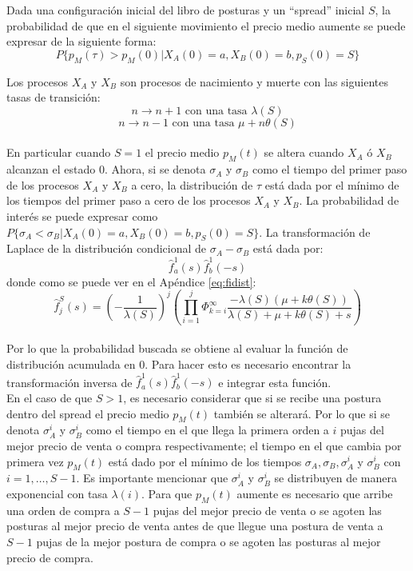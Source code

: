 \documentclass[11pt]{article}
\numberwithin{equation}{section} %
\begin{document}
Dada una configuración inicial del libro de posturas y un ``spread'' inicial $S$, la probabilidad de que en el siguiente movimiento el precio medio aumente se puede expresar de la siguiente forma:
\[
P\{p_M(\tau)>p_M(0)|X_A(0)=a,X_B(0)=b,p_S(0)=S\}
\]

Los procesos $X_A$ y $X_B$ son procesos de nacimiento y muerte con las siguientes tasas de transición:
\[
n\rightarrow n+1 \text{ con una tasa }\lambda(S)
\]
\[
n\rightarrow n-1 \text{ con una tasa }\mu+n\theta(S)
\]\\

En particular cuando $S=1$ el precio medio $p_M(t)$ se altera cuando $X_A$ ó $X_B$ alcanzan el estado 0. Ahora, si se denota $\sigma_A$ y $\sigma_B$ como el tiempo del primer paso de los procesos $X_A$ y $X_B$ a cero, la distribución de $\tau$ está dada por el mínimo de los tiempos del primer paso a cero de los procesos $X_A$ y $X_B$. La probabilidad de interés se puede expresar como $P\{\sigma_A<\sigma_B|X_A(0)=a,X_B(0)=b,p_S(0)=S\}$. La transformación de Laplace de la distribución condicional de $\sigma_A-\sigma_B$ está dada por:
\[
\hat{f}_a^1(s)\hat{f}_b^1(-s)
\]
donde como se puede ver en el Apéndice \ref{eq:fidist}:
\[
\hat{f}_{j}^S(s)=\left(-\frac{1}{\lambda(S)}\right)^j\left( \prod_{i=1}^j \Phi_{k=i}^\infty \frac{-\lambda(S)(\mu+k\theta(S))}{\lambda(S)+\mu+k\theta(S)+s} \right)
\]\\

Por lo que la probabilidad buscada se obtiene al evaluar la función de distribución acumulada en 0. Para hacer esto es necesario encontrar la transformación inversa de $\hat{f}_a^1(s)\hat{f}_b^1(-s)$ e integrar esta función.\\

En el caso de que $S>1$, es necesario considerar que si se recibe una postura dentro del spread el precio medio $p_M(t)$ también se alterará. Por lo que si se denota $\sigma_A^i$ y $\sigma_B^i$ como el tiempo en el que llega la primera orden a $i$ pujas del mejor precio de venta o compra respectivamente; el tiempo en el que cambia por primera vez $p_M(t)$ está dado por el mínimo de los tiempos $\sigma_A,\sigma_B,\sigma_A^i$ y $\sigma_B^i$ con $i=1,\ldots,S-1$. Es importante mencionar que $\sigma_A^i$ y $\sigma_B^i$ se distribuyen de manera exponencial con tasa $\lambda(i)$. Para que $p_M(t)$ aumente es necesario que arribe una orden de compra a $S-1$ pujas del mejor precio de venta o se agoten las posturas al mejor precio de venta antes de que llegue una postura de venta a $S-1$ pujas de la mejor postura de compra o se agoten las posturas al mejor precio de compra.\\
\end{document}
